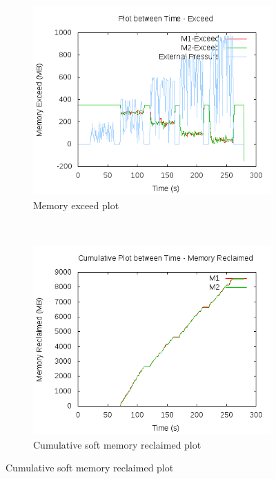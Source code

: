 	  \begin{figure}[t!]
	    \centering
	    \begin{subfigure}[t]{0.48\textwidth}
	      \centering
	      \includegraphics[width=1\textwidth]{images/controller_issues/exceed_only/Exceed.png}
	      \caption{Memory exceed plot}
	      \label{img_exceed_only_1_exceed}
	    \end{subfigure}
	    ~ 
	    \begin{subfigure}[t]{0.48\textwidth}
	      \centering
	      \includegraphics[width=1\textwidth]{images/controller_issues/exceed_only/Memory_Reclaimed.png}
	      \caption{Cumulative soft memory reclaimed plot}

\end{subfigure}
\end{figure}
